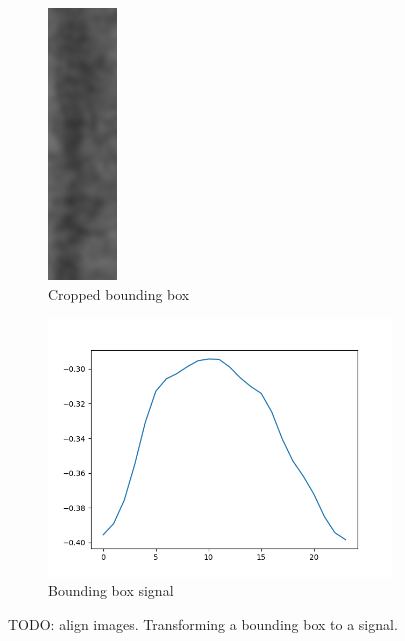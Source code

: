 \begin{figure}[!h]
\begin{center}
        \begin{subfigure}{0.3\textwidth}
        \centering
        \includegraphics[width=0.2\textwidth]{images/crop_bb}
        \caption{Cropped bounding box}
    \end{subfigure}
                \quad
    \begin{subfigure}{0.55\textwidth}
        \includegraphics[width=\textwidth]{images/signal_bb}
        \caption{Bounding box signal}
    \end{subfigure}
            \quad

\caption{TODO: align images.  Transforming a bounding box to a signal.}
\label{default}
\end{center}
\end{figure}

